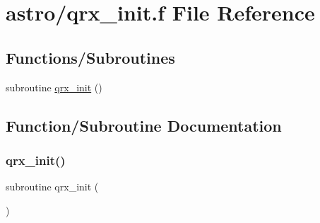 \hypertarget{qrx__init_8f}{}\section{astro/qrx\+\_\+init.f File Reference}
\label{qrx__init_8f}
\subsection*{Functions/\+Subroutines}
\begin{DoxyCompactItemize}
\item 
subroutine \hyperlink{qrx__init_8f_a60944d185663a5db70c6545062a4ff9a}{qrx\+\_\+init} ()
\end{DoxyCompactItemize}


\subsection{Function/\+Subroutine Documentation}
\mbox{\label{qrx__init_8f_a60944d185663a5db70c6545062a4ff9a}} 
\subsubsection{\texorpdfstring{qrx\+\_\+init()}{qrx\_init()}}
{\footnotesize\ttfamily subroutine qrx\+\_\+init (\begin{DoxyParamCaption}{ }\end{DoxyParamCaption})}

